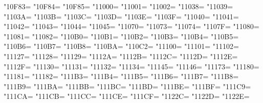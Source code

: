 \XeTeXcharclass"10F83=\KclassCM
\XeTeXcharclass"10F84=\KclassCM
\XeTeXcharclass"10F85=\KclassCM
\XeTeXcharclass"11000=\KclassCM
\XeTeXcharclass"11001=\KclassCM
\XeTeXcharclass"11002=\KclassCM
\XeTeXcharclass"11038=\KclassCM
\XeTeXcharclass"11039=\KclassCM
\XeTeXcharclass"1103A=\KclassCM
\XeTeXcharclass"1103B=\KclassCM
\XeTeXcharclass"1103C=\KclassCM
\XeTeXcharclass"1103D=\KclassCM
\XeTeXcharclass"1103E=\KclassCM
\XeTeXcharclass"1103F=\KclassCM
\XeTeXcharclass"11040=\KclassCM
\XeTeXcharclass"11041=\KclassCM
\XeTeXcharclass"11042=\KclassCM
\XeTeXcharclass"11043=\KclassCM
\XeTeXcharclass"11044=\KclassCM
\XeTeXcharclass"11045=\KclassCM
\XeTeXcharclass"11070=\KclassCM
\XeTeXcharclass"11073=\KclassCM
\XeTeXcharclass"11074=\KclassCM
\XeTeXcharclass"1107F=\KclassCM
\XeTeXcharclass"11080=\KclassCM
\XeTeXcharclass"11081=\KclassCM
\XeTeXcharclass"11082=\KclassCM
\XeTeXcharclass"110B0=\KclassCM
\XeTeXcharclass"110B1=\KclassCM
\XeTeXcharclass"110B2=\KclassCM
\XeTeXcharclass"110B3=\KclassCM
\XeTeXcharclass"110B4=\KclassCM
\XeTeXcharclass"110B5=\KclassCM
\XeTeXcharclass"110B6=\KclassCM
\XeTeXcharclass"110B7=\KclassCM
\XeTeXcharclass"110B8=\KclassCM
\XeTeXcharclass"110BA=\KclassCM
\XeTeXcharclass"110C2=\KclassCM
\XeTeXcharclass"11100=\KclassCM
\XeTeXcharclass"11101=\KclassCM
\XeTeXcharclass"11102=\KclassCM
\XeTeXcharclass"11127=\KclassCM
\XeTeXcharclass"11128=\KclassCM
\XeTeXcharclass"11129=\KclassCM
\XeTeXcharclass"1112A=\KclassCM
\XeTeXcharclass"1112B=\KclassCM
\XeTeXcharclass"1112C=\KclassCM
\XeTeXcharclass"1112D=\KclassCM
\XeTeXcharclass"1112E=\KclassCM
\XeTeXcharclass"1112F=\KclassCM
\XeTeXcharclass"11130=\KclassCM
\XeTeXcharclass"11131=\KclassCM
\XeTeXcharclass"11132=\KclassCM
\XeTeXcharclass"11134=\KclassCM
\XeTeXcharclass"11145=\KclassCM
\XeTeXcharclass"11146=\KclassCM
\XeTeXcharclass"11173=\KclassCM
\XeTeXcharclass"11180=\KclassCM
\XeTeXcharclass"11181=\KclassCM
\XeTeXcharclass"11182=\KclassCM
\XeTeXcharclass"111B3=\KclassCM
\XeTeXcharclass"111B4=\KclassCM
\XeTeXcharclass"111B5=\KclassCM
\XeTeXcharclass"111B6=\KclassCM
\XeTeXcharclass"111B7=\KclassCM
\XeTeXcharclass"111B8=\KclassCM
\XeTeXcharclass"111B9=\KclassCM
\XeTeXcharclass"111BA=\KclassCM
\XeTeXcharclass"111BB=\KclassCM
\XeTeXcharclass"111BC=\KclassCM
\XeTeXcharclass"111BD=\KclassCM
\XeTeXcharclass"111BE=\KclassCM
\XeTeXcharclass"111BF=\KclassCM
\XeTeXcharclass"111C9=\KclassCM
\XeTeXcharclass"111CA=\KclassCM
\XeTeXcharclass"111CB=\KclassCM
\XeTeXcharclass"111CC=\KclassCM
\XeTeXcharclass"111CE=\KclassCM
\XeTeXcharclass"111CF=\KclassCM
\XeTeXcharclass"1122C=\KclassCM
\XeTeXcharclass"1122D=\KclassCM
\XeTeXcharclass"1122E=\KclassCM
